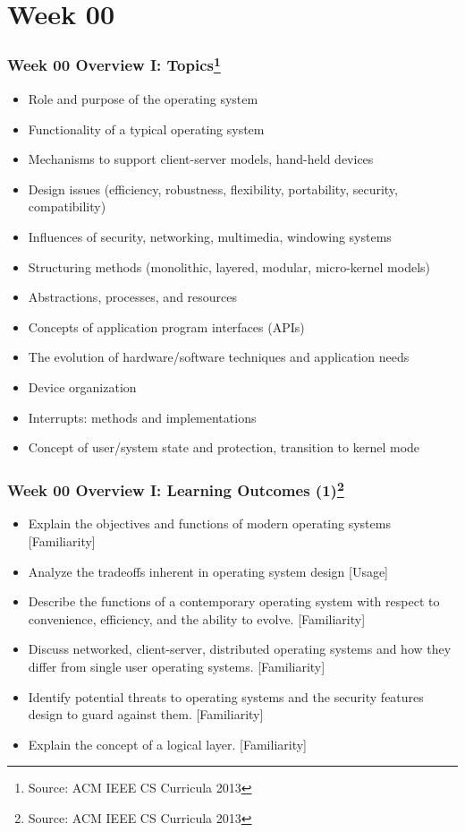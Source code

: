 
\section{Week 00}
\begin{frame}[fragile]
\frametitle{Week 00 Overview I:
Topics\footnote{Source: ACM IEEE CS Curricula 2013}}

\begin{itemize}
\item Role and purpose of the operating system 
\item Functionality of a typical operating system 
\item Mechanisms to support client-server models, hand-held devices 
\item Design issues (efficiency, robustness, flexibility, portability, security, compatibility) 
\item Influences of security, networking, multimedia, windowing systems 
\item Structuring methods (monolithic, layered, modular, micro-kernel models) 
\item Abstractions, processes, and resources 
\item Concepts of application program interfaces (APIs) 
\item The evolution of hardware/software techniques and application needs 
\item Device organization 
\item Interrupts: methods and implementations 
\item Concept of user/system state and protection, transition to kernel mode 
\end{itemize}
\end{frame}

\begin{frame}[fragile]
\frametitle{Week 00 Overview I:
Learning Outcomes (1)\footnote{Source: ACM IEEE CS Curricula 2013}}
\begin{itemize}
\item Explain the objectives and functions of modern operating systems [Familiarity]
\item Analyze the tradeoffs inherent in operating system design [Usage]
\item Describe the functions of a contemporary operating system with respect to convenience, efficiency, and the ability to evolve. [Familiarity] 
\item Discuss networked, client-server, distributed operating systems and how they differ from single user operating systems. [Familiarity] 
\item Identify potential threats to operating systems and the security features design to guard against them. [Familiarity] 
\item Explain the concept of a logical layer.  [Familiarity] 
\end{itemize}
\end{frame}


